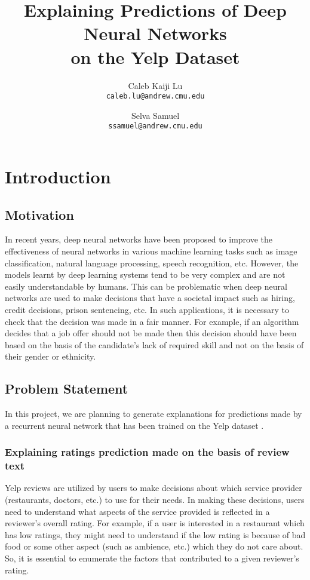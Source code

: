 \documentclass[11pt]{article}
\title{Explaining Predictions of Deep Neural Networks \\ on the Yelp Dataset}
\author{
	Caleb Kaiji Lu \\
	{\tt caleb.lu@andrew.cmu.edu}
	\and
	Selva Samuel \\
	{\tt ssamuel@andrew.cmu.edu}
}
\date{}
\begin{document}
\maketitle

\section{Introduction}

\subsection{Motivation}

In recent years, deep neural networks have been proposed to improve the effectiveness of neural networks in various machine learning tasks such as image classification, natural language processing, speech recognition, etc. However, the models learnt by deep learning systems tend to be very complex and are not easily understandable by humans. This can be problematic when deep neural networks are used to make decisions that have a societal impact such as hiring, credit decisions, prison sentencing, etc. In such applications, it is necessary to check that the decision was made in a fair manner. For example, if an algorithm decides that a job offer should not be made then this decision should have been based on the basis of the candidate's lack of required skill and not on the basis of their gender or ethnicity.

\subsection{Problem Statement}

In this project, we are planning to generate explanations for predictions made by a recurrent neural network that has been trained on the Yelp dataset \cite{Yelp2017}.

\subsubsection{Explaining ratings prediction made on the basis of review text}

Yelp reviews are utilized by users to make decisions about which service provider (restaurants, doctors, etc.) to use for their needs. In making these decisions, users need to understand what aspects of the service provided is reflected in a reviewer's overall rating. For example, if a user is interested in a restaurant which has low ratings, they might need to understand if the low rating is because of bad food or some other aspect (such as ambience, etc.) which they do not care about. So, it is essential to enumerate the factors that contributed to a given reviewer's rating.
\end{document}
